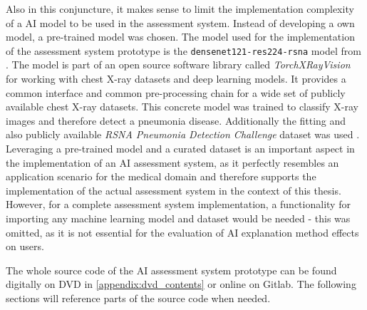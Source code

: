 \documentclass[11pt,a4paper,english]{scrreprt}
\begin{document}
Also in this conjuncture, it makes sense to limit the implementation complexity of a AI model to be used in the assessment system. Instead of developing a own model, a pre-trained model was chosen. The model used for the implementation of the assessment system prototype is the \texttt{densenet121-res224-rsna} model from \textcite{cohen_torchxrayvision_2021}. The model is part of an open source software library called \textit{TorchXRayVision} for working with chest X-ray datasets and deep learning models. It provides a common interface and common pre-processing chain for a wide set of publicly available chest X-ray datasets. This concrete model was trained to classify X-ray images and therefore detect a pneumonia disease. Additionally the fitting and also publicly available \textit{RSNA Pneumonia Detection Challenge} dataset was used \parencite{rsna_kaggle_website}. Leveraging a pre-trained model and a curated dataset is an important aspect in the implementation of an AI assessment system, as it perfectly resembles an application scenario for the medical domain and therefore supports the implementation of the actual assessment system in the context of this thesis. However, for a complete assessment system implementation, a functionality for importing any machine learning model and dataset would be needed - this was omitted, as it is not essential for the evaluation of AI explanation method effects on users.

The whole source code of the AI assessment system prototype can be found digitally on DVD in \autoref{appendix:dvd_contents} or online on Gitlab. The following sections will reference parts of the source code when needed.
\end{document}
